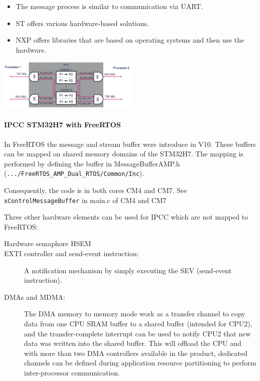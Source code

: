 \begin{paracol}{2}
    \begin{itemize}
        \item The message process is similar to communication via UART.
        \item ST offers various hardware-based solutions.
        \item NXP offers libraries that are based on operating systems and then use the hardware.
    \end{itemize}
    \switchcolumn
    \includegraphics[width=0.5\textwidth]{images/Multicore/ipcc.png}
\end{paracol}

\paragraph{IPCC STM32H7 with FreeRTOS}
In FreeRTOS the message and stream buffer were introduce in V10.
These buffers can be mapped on shared memory domains of the STM32H7.
The mapping is performed by defining the buffer in MessageBufferAMP.h (\texttt{.../FreeRTOS\_AMP\_Dual\_RTOS/Common/Inc}).

Consequently, the code is in both cores CM4 and CM7.
See \texttt{xControlMessageBuffer} in main.c of CM4 and CM7

Three other hardware elements can be used for IPCC which are not mapped to FreeRTOS:
\begin{description}
    \item[Hardware semaphore HSEM]
    \item[EXTI controller and send-event instruction:] A notification mechanism by simply executing the SEV (send-event instruction).
    \item[DMAs and MDMA:] The DMA memory to memory mode work as a transfer channel to copy data from one CPU SRAM buffer to a shared buffer (intended for CPU2), and the transfer-complete interrupt can be used to notify CPU2 that new data was written into the shared buffer.
          This will offload the CPU and with more than two DMA controllers available in the product, dedicated channels can be defined during application resource partitioning to perform inter-processor communication.
\end{description}

